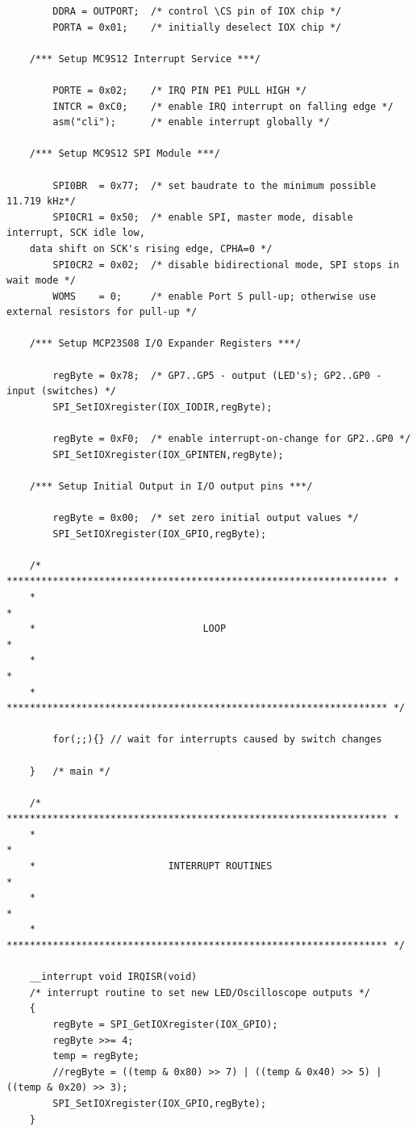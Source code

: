 \documentclass{article}
\begin{document}
\begin{lstlisting}
		DDRA = OUTPORT;  /* control \CS pin of IOX chip */
		PORTA = 0x01;    /* initially deselect IOX chip */
	
	/*** Setup MC9S12 Interrupt Service ***/
	
		PORTE = 0x02;    /* IRQ PIN PE1 PULL HIGH */
		INTCR = 0xC0;    /* enable IRQ interrupt on falling edge */
		asm("cli");      /* enable interrupt globally */
	
	/*** Setup MC9S12 SPI Module ***/
	
		SPI0BR  = 0x77;  /* set baudrate to the minimum possible 11.719 kHz*/
		SPI0CR1 = 0x50;  /* enable SPI, master mode, disable interrupt, SCK idle low,
	data shift on SCK's rising edge, CPHA=0 */
		SPI0CR2 = 0x02;  /* disable bidirectional mode, SPI stops in wait mode */
		WOMS    = 0;     /* enable Port S pull-up; otherwise use external resistors for pull-up */
	
	/*** Setup MCP23S08 I/O Expander Registers ***/
	
		regByte = 0x78;  /* GP7..GP5 - output (LED's); GP2..GP0 - 	input (switches) */
		SPI_SetIOXregister(IOX_IODIR,regByte);
	
		regByte = 0xF0;  /* enable interrupt-on-change for GP2..GP0 */
		SPI_SetIOXregister(IOX_GPINTEN,regByte);
	
	/*** Setup Initial Output in I/O output pins ***/
	
		regByte = 0x00;  /* set zero initial output values */
		SPI_SetIOXregister(IOX_GPIO,regByte);
	
	/* ****************************************************************** *
	*                                                                    *
	*                             LOOP                                   *
	*                                                                    *
	* ****************************************************************** */
	
		for(;;){} // wait for interrupts caused by switch changes
	
	}   /* main */
	
	/* ****************************************************************** *
	*                                                                    *
	*                       INTERRUPT ROUTINES                           *
	*                                                                    *
	* ****************************************************************** */
	
	__interrupt void IRQISR(void)
	/* interrupt routine to set new LED/Oscilloscope outputs */
	{
		regByte = SPI_GetIOXregister(IOX_GPIO);
		regByte >>= 4;
		temp = regByte;
		//regByte = ((temp & 0x80) >> 7) | ((temp & 0x40) >> 5) | ((temp & 0x20) >> 3);  
		SPI_SetIOXregister(IOX_GPIO,regByte);
	}
	

\end{lstlisting}
\end{document}
